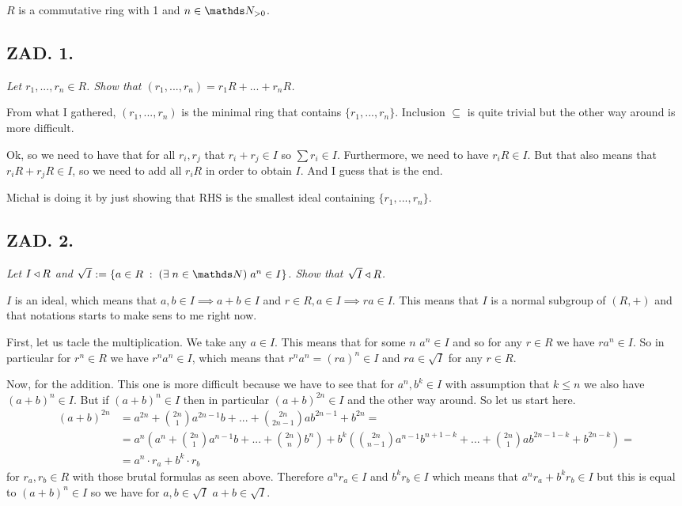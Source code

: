 \documentclass{article}[13pt]
\begin{document}
$R$ is a commutative ring with 1 and $n\in\N_{>0}$.

\subsection*{ZAD. 1.}
\emph{Let $r_1,...,r_n\in R$. Show that $(r_1,...,r_n)=r_1R+...+r_nR$.}
\medskip

\medskip

From what I gathered, $(r_1,...,r_n)$ is the minimal ring that contains $\{r_1,...,r_n\}$. Inclusion $\subseteq$ is quite trivial but the other way around is more difficult.
\medskip

Ok, so we need to have that for all $r_i,r_j$ that $r_i+r_j\in I$ so $\sum r_i\in I$. Furthermore, we need to have $r_iR\in I$. But that also means that $r_iR+r_jR\in I$, so we need to add all $r_iR$ in order to obtain $I$. And I guess that is the end.
\bigskip

Michał is doing it by just showing that RHS is the smallest ideal containing $\{r_1,...,r_n\}$.

\subsection*{ZAD. 2.}
\emph{Let $I\triangleleft R$ and $\sqrt{I}:=\{a\in R\;:\;(\exists\;n\in \N)\;a^n\in I\}$. Show that $\sqrt{I}\triangleleft R$.}
\medskip

\medskip

$I$ is an ideal, which means that $a,b\in I\implies a+b\in I$ and $r\in R,a\in I\implies ra\in I$. This means that $I$ is a normal subgroup of $(R, +)$ and that notations starts to make sens to me right now.
\smallskip

First, let us tacle the multiplication. We take any $a\in I$. This means that for some $n$ $a^n\in I$ and so for any $r\in R$ we have $ra^n\in I$. So in particular for $r^n\in R$ we have $r^na^n\in I$, which means that $r^na^n=(ra)^n\in I$ and $ra\in\sqrt{I}$ for any $r\in R$.
\smallskip

Now, for the addition. This one is more difficult because we have to see that for $a^n, b^k\in I$ with assumption that $k\leq n$ we also have $(a+b)^n\in I$. But if $(a+b)^n\in I$ then in particular $(a+b)^{2n}\in I$ and the other way around. So let us start here. 
\begin{align*}
    (a+b)^{2n}&=a^{2n}+{2n\choose 1}a^{2n-1}b+...+{2n\choose 2n-1}ab^{2n-1}+b^{2n}=\\
    &=a^n(a^n+{2n\choose 1}a^{n-1}b+...+{2n\choose n}b^n)+b^k({2n\choose n-1}a^{n-1}b^{n+1-k}+...+{2n\choose 1}ab^{2n-1-k}+b^{2n-k})=\\
    &=a^n\cdot r_a+b^k\cdot r_b
\end{align*}
for $r_a,r_b\in R$ with those brutal formulas as seen above. Therefore $a^nr_a\in I$ and $b^kr_b\in I$ which means that $a^nr_a+b^kr_b\in I$ but this is equal to $(a+b)^n\in I$ so we have for $a,b\in\sqrt{I}$ $a+b\in\sqrt{I}$.
\end{document}
